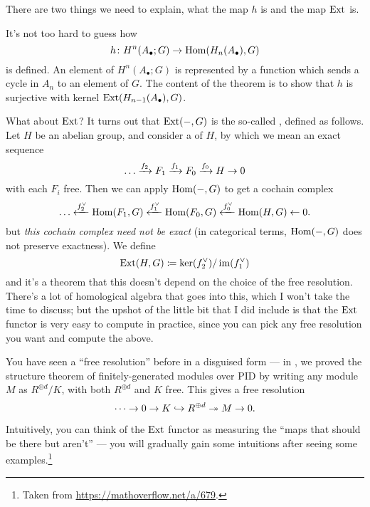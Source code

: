 There are two things we need to explain, what the map $h$ is and the map $\operatorname{Ext}$ is.

It's not too hard to guess how \[ h \colon H^n(A_\bullet; G) \to \operatorname{Hom}(H_n(A_\bullet), G) \] is defined.
An element of $H^n(A_\bullet;G)$ is represented by a function which sends a cycle
in $A_n$ to an element of $G$.
The content of the theorem is to show that $h$ is surjective with kernel $\operatorname{Ext}(H_{n-1}(A_\bullet), G)$.

What about $\operatorname{Ext}$?
It turns out that $\operatorname{Ext}(-,G)$ is the so-called , defined as follows.
Let $H$ be an abelian group, and consider a  of $H$,
by which we mean an exact sequence
\[ \dots \xrightarrow{f_2} F_1 \xrightarrow{f_1} F_0 \xrightarrow{f_0} H \to 0 \]
with each $F_i$ free.
Then we can apply $\operatorname{Hom}(-,G)$ to get a cochain complex
\[ \dots \xleftarrow{f_2^\vee} \operatorname{Hom}(F_1, G) \xleftarrow{f_1^\vee}
	\operatorname{Hom}(F_0, G) \xleftarrow{f_0^\vee} \operatorname{Hom}(H,G) \leftarrow 0. \]
but \emph{this cochain complex need not be exact}
(in categorical terms, $\operatorname{Hom}(-,G)$ does not preserve exactness).
We define \[ \operatorname{Ext}(H,G) \coloneqq \ker(f_2^\vee) / \operatorname{im}(f_1^\vee) \]
and it's a theorem that this doesn't depend on the choice of the free resolution.
There's a lot of homological algebra that goes into this,
which I won't take the time to discuss;
but the upshot of the little bit that I did include is that the $\operatorname{Ext}$
functor is very easy to compute in practice, since
you can pick any free resolution you want and compute the above.

\begin{remark}
	You have seen a ``free resolution'' before in a disguised form ---
	in , we proved the structure theorem of finitely-generated modules
	over PID by writing any module $M$ as $R^{\oplus d}/K$, with both $R^{\oplus d}$ and $K$ free.
	This gives a free resolution
	\[ \dots \to 0 \to K \hookrightarrow R^{\oplus d} \twoheadrightarrow M \to 0. \]

	Intuitively, you can think of the $\operatorname{Ext}$ functor as measuring the ``maps that should be there
	but aren't'' --- you will gradually gain some intuitions after seeing some
	examples.\footnote{Taken from \url{https://mathoverflow.net/a/679}.}
\end{remark}


